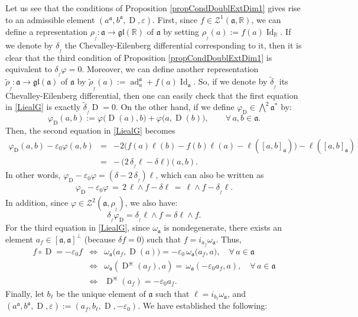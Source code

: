 \documentclass[final,1p,times,nopreprintline]{elsarticle}
\theoremstyle{definition}
\numberwithin{equation}{section}
\newcommand{\ro}{\circ}
\newcommand{\rel}{\mathbb{R}}
\newcommand{\w}{\omega}
\newcommand{\id}{\operatorname{Id}}
\newcommand{\ai}{\mathfrak{a}}
\newcommand{\ad}{\operatorname{ad}}
\numberwithin{equation}{section}
\newcommand{\D}{\operatorname{D}}
\newcommand{\gl}{\mathfrak{gl}}
\begin{document}
Let us see that the conditions of Proposition \ref{propCondDoublExtDim1} gives rise to an admissible element $(a^\ai,b^\ai,\D,\varepsilon)$. First, since $f\in\mathcal{Z}^1(\ai,\rel)$, we can define a representation $\rho_{_f}:\ai\to\gl(\rel)$ of $\ai$ by setting $\rho_{_f}(a):=f(a)\id_\rel$. If we denote by $\delta_{_f}$ the Chevalley-Eilenberg differential corresponding to it, then it is clear that the third condition of Proposition \ref{propCondDoublExtDim1} is equivalent to $\delta_{_f}\varphi=0$. Moreover, we can define another representation $\widetilde{\rho}_{_f}:\ai\to\gl(\ai)$ of $\ai$ by $\widetilde{\rho}_{_f}(a):=\ad^\ai_a+f(a)\id_\ai$. So, if we denote by $\widetilde{\delta}_{_f}$ its Chevalley-Eilenberg differential, then one can easily check that the first equation in \eqref{LiealG} is exactly $\widetilde{\delta}_{_f}\D=0$. On the other hand, if we define $\varphi_{\D}\in\bigwedge^2\ai^*$ by:
\begin{equation*}
\varphi_{\D}(a,b):=\varphi\big(\D(a),b\big)+\varphi\big(a,\D(b)\big),\qquad\forall\,a,b\in\ai.
\end{equation*}
Then, the second equation in \eqref{LiealG} becomes 
\begin{eqnarray*}
	\varphi_{\D}(a,b)-\varepsilon_0\varphi(a,b)&=&-2\Big(f(a)\ell(b)-f(b)\ell(a)-\ell([a,b]_\ai)\Big)-\ell([a,b]_\ai)\\
	&=&-\,\Big(2\,\delta_{_f}\ell-\delta\ell\Big)(a,b).
\end{eqnarray*}
In other words, $\varphi_{\D}-\varepsilon_0\varphi=\left(\delta-2\,\delta_{_f}\right)\ell$, which can also be written as
\begin{eqnarray*}
	\varphi_{\D}-\varepsilon_0\varphi\,=\,2\,\ell\wedge f-\delta\ell\,=\,\ell\wedge f-\delta_{_f}\ell.
\end{eqnarray*}
In addition, since $\varphi\in\mathcal{Z}^2(\ai,\rho_{_f})$, we also have: $$\delta_{_f}\varphi_{\D}=\delta_{_f}\ell\wedge f=\delta\ell\wedge f.$$
For the third equation in \eqref{LiealG}, since $\w_\ai$ is nondegenerate, there exists an element $a_f\in[\ai,\ai]^\perp$ (because $\delta f=0$) such that $f=i_{a_f}\w_\ai$. Thus,
\begin{eqnarray*}
	f\ro\D=-\varepsilon_0 f&\Leftrightarrow&\w_\ai\big(a_f,\D(a)\big)=-\varepsilon_0\,\w_\ai\big(a_f,a\big),\quad\forall\,a\in\ai\\
	&\Leftrightarrow& \w_\ai\left(\D^\divideontimes(a_f),a\right)=\,\w_\ai\left(-\varepsilon_0a_f,a\right),\quad\forall\,a\in\ai\\
	&\Leftrightarrow&\D^\divideontimes(a_f)=-\varepsilon_0a_f.
\end{eqnarray*}
Finally, let $b_\ell$ be the unique element of $\ai$ such that $\ell=i_{b_\ell}\w_\ai$, and $(a^\ai,b^\ai,\D,\varepsilon):=(a_f,b_\ell,\D,-\varepsilon_0)$. We have established the following:
\end{document}
